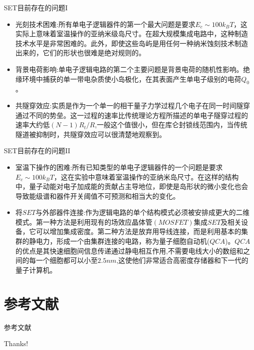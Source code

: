 \documentclass{beamer}[fontset=windows]
\begin{document}
    \begin{frame}
    \begin{block}{SET目前存在的问题I}
    \begin{itemize}
    \item 光刻技术困难:所有单电子逻辑器件的第一个最大问题是要求$E_{c}\sim100k_{B}T$，这实际上意味着室温操作的亚纳米级岛尺寸。在超大规模集成电路中，这种制造技术水平是非常困难的。此外，即使这些岛屿是用任何一种纳米蚀刻技术制造出来的，它们的形状也很难是绝对规则的。
    \item 背景电荷影响:单电子逻辑电路的第二个主要问题是背景电荷的随机性影响。绝缘环境中捕获的单一带电杂质使小岛极化，在其表面产生单电子级别的电荷$Q_{0}$。
    \item 共隧穿效应:实质是作为一个单一的相干量子力学过程几个电子在同一时间隧穿通过不同的势垒。这一过程的速率比传统理论方程所描述的单电子隧穿过程的速率大约低$(N-1)R_{t}/R$,一般这个值很小，但在库仑封锁线范围内，当传统隧道被抑制时，共隧穿效应可以很清楚地观察到。
    \end{itemize}
    \end{block}
    \end{frame}
    \begin{frame}
    \begin{block}{SET目前存在的问题II}
    \begin{itemize}
    \item 室温下操作的困难:所有已知类型的单电子逻辑器件的一个问题是要求$E_{c} \sim 100 k_{B}T$，这在实验中意味着室温操作的亚纳米岛尺寸。在这样的结构中，量子动能对电子加成能的贡献占主导地位，即使是岛形状的微小变化也会导致能级谱和器件开关阈值不可预测和相当大的变化。
    \item 将$SET$与外部器件连接:作为逻辑电路的单个结构模式必须被安排成更大的二维模式。第一种方法是利用现有的场效应晶体管$(MOSFET)$集成$SET$及相关设备，它可以增加集成密度。第二种方法是放弃用导线连接，而是利用基本的集群的静电力，形成一个由集群连接的电路，称为量子细胞自动机($QCA$)。$QCA$的优点是其快速细胞间信息传递通过静电相互作用,不需要电线大小的数组和之间的每一个细胞都可以小至$2.5nm$,这使他们非常适合高密度存储器和下一代的量子计算机。
    \end{itemize}
    \end{block}
    \end{frame}
    \section{参考文献}	
    \begin{frame}[allowframebreaks]{参考文献}
    \printbibliography[heading=none]
    \end{frame}
	\begin{frame}
		\begin{center}
			{\Huge\calligra Thanks!}
		\end{center}
	\end{frame}
\end{document}
